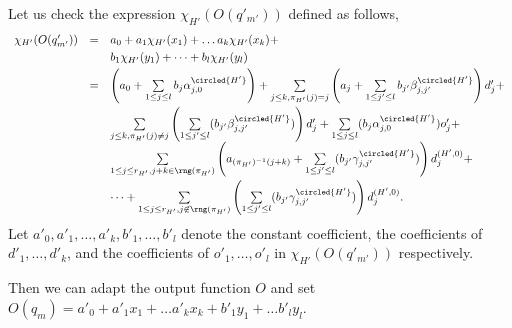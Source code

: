 {	Let us check the expression $\chi_{H'}(O(q'_{m'}))$ defined as follows,
	\[
	\begin{array}{l c l}
	\smallskip
	\chi_{H'}(O(q'_{m'})) & = & a_0 + a_1 \chi_{H'}(x_1) + \dots a_k \chi_{H'}(x_k) + \\
	\smallskip
	& & b_1 \chi_{H'}(y_1) + \dots + b_l \chi_{H'}(y_l) \\
	\smallskip
	&  = &  \left(a_0+\sum \limits_{1 \le j \le l} b_j \alpha^{\circled{H'}}_{j,0} \right) + \sum \limits_{j \le k, \pi_{H'}(j)=j} \left(a_j + \sum \limits_{1 \le j' \le l} b_{j'} \beta^{\circled{H'}}_{j,j'} \right) d'_j  + \\
	& & \sum \limits_{j \le k, \pi_{H'}(j) \neq j} \left(\sum \limits_{1 \le j' \le l} (b_{j'} \beta^{\circled{H'}}_{j,j'})\right) d'_j + \sum \limits_{1\le j \le l} (b_{j} \alpha^{\circled{H'}}_{j,0}) o'_{j} + \\
	\smallskip
	& & \sum \limits_{1 \le j \le r_{H'}, j+k \in \rng(\pi_{H'})} \left(a_{(\pi_{H'})^{-1}(j+k)}+\sum \limits_{1 \le j' \le l} (b_{j'} \gamma^{\circled{H'}}_{j,j'})\right) d^{(H',0)}_j +\\ & & \dots  + \sum \limits_{1 \le j \le r_{H'}, j \not \in \rng(\pi_{H'})} \left(\sum \limits_{1 \le j' \le l} (b_{j'} \gamma^{\circled{H'}}_{j,j'})\right) d^{(H',0)}_j.
	\end{array}
	\] 
	Let $a'_0,a'_1,\dots,a'_k,b'_1,\dots,b'_l$ denote the constant coefficient, the coefficients of $d'_1,\dots,d'_k$, and the coefficients of $o'_1,\dots,o'_l$ in $\chi_{H'}(O(q'_{m'}))$ respectively. 
	
	Then we can adapt the output function $O$ and set $O(q_m) = a'_0 + a'_1 x_1 + \dots a'_k x_k + b'_1 y_1 + \dots b'_l y_l$.
}


